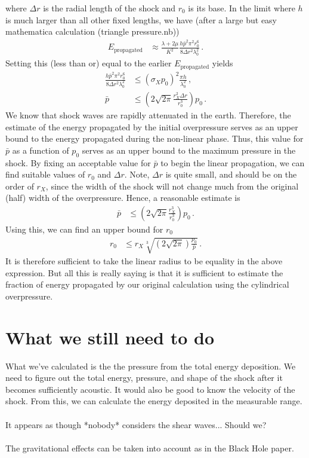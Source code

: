 \documentclass{article}
\newcommand*\te[1]{\text{#1}}
\newcommand*\p[1]{\left(#1\right)}
\newcommand*\f[2]{\frac{#1}{#2}}
\begin{document}
where $\Delta r$ is the radial length of the shock and $r_0$ is its base. In the limit where $h$ is much larger than all other fixed lengths, we have (after a large but easy mathematica calculation (triangle pressure.nb))
\begin{align}
E_{\te{propagated}}&\approx \f{\lambda+2\mu}{K^2}\f{h \bar p^2\pi^2r_0^6}{8\Delta r^2\lambda_0^2}\,.
\end{align}
Setting this (less than or) equal to the earlier $E_{\te{propagated}}$ yields
\begin{align}
\f{h \bar p^2\pi^2r_0^6}{8\Delta r^2\lambda_0^2}&\leq (\sigma_Xp_0)^2\f{\pi h}{\lambda_0^2}\,,\\
\bar p&\leq\p{2\sqrt{2\pi}\f{r_X^2\Delta r}{r_0^3}}p_0\,.
\end{align}
We know that shock waves are rapidly attenuated in the earth. Therefore, the estimate of the energy propagated by the initial overpressure serves as an upper bound to the energy propagated during the non-linear phase. Thus, this value for $\bar p$ as a function of $p_0$ serves as an upper bound to the maximum pressure in the shock. By fixing an acceptable value for $\bar p$ to begin the linear propagation, we can find suitable values of $r_0$ and $\Delta r$. Note, $\Delta r$ is quite small, and should be on the order of $r_X$, since the width of the shock will not change much from the original (half) width of the overpressure. Hence, a reasonable estimate is
\begin{align}
\bar p&\leq\p{2\sqrt{2\pi}\f{r_X^3}{r_0^3}}p_0\,.
\end{align}
Using this, we can find an upper bound for $r_0$
\begin{align}
r_0&\leq r_X\sqrt[3]{\p{2\sqrt{2\pi}}\f{p_0}{\bar p}}\,.
\end{align}
It is therefore sufficient to take the linear radius to be equality in the above expression. But all this is really saying is that it is sufficient to estimate the fraction of energy propagated by our original calculation using the cylindrical overpressure.
\pagebreak
\section{What we still need to do}
What we've calculated is the the pressure from the total energy deposition. We need to figure out the total energy, pressure, and shape of the shock after it becomes sufficiently acoustic. It would also be good to know the velocity of the shock. From this, we can calculate the energy deposited in the measurable range.
\\\\
It appears as though *nobody* considers the shear waves... Should we?
\\\\
The gravitational effects can be taken into account as in the Black Hole paper.
\end{document}
